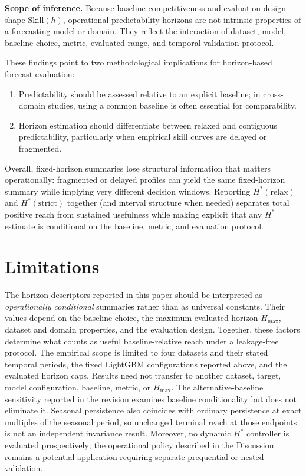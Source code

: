\documentclass[pdflatex]{sn-jnl}
\begin{document}
\textbf{Scope of inference.} Because baseline competitiveness and evaluation design shape $\mathrm{Skill}(h)$, operational predictability horizons are not intrinsic properties of a forecasting model or domain. They reflect the interaction of dataset, model, baseline choice, metric, evaluated range, and temporal validation protocol.

These findings point to two methodological implications for horizon-based forecast evaluation:
\begin{enumerate}
  \item Predictability should be assessed relative to an explicit baseline; in cross-domain studies, using a common baseline is often essential for comparability.
  \item Horizon estimation should differentiate between relaxed and contiguous predictability, particularly when empirical skill curves are delayed or fragmented.
\end{enumerate}

Overall, fixed-horizon summaries lose structural information that matters operationally: fragmented or delayed profiles can yield the same fixed-horizon summary while implying very different decision windows. Reporting $H^*(\mathrm{relax})$ and $H^*(\mathrm{strict})$ together (and interval structure when needed) separates total positive reach from sustained usefulness while making explicit that any $H^*$ estimate is conditional on the baseline, metric, and evaluation protocol.

\section{Limitations}

The horizon descriptors reported in this paper should be interpreted as
\emph{operationally conditional} summaries rather than as universal
constants. Their values depend on the baseline choice, the maximum
evaluated horizon $H_{\max}$, dataset and domain properties, and the
evaluation design. Together, these factors determine what counts as
useful baseline-relative reach under a leakage-free protocol.
The empirical scope is limited to four datasets and their stated temporal
periods, the fixed LightGBM configurations reported above, and the evaluated
horizon caps. Results need not transfer to another dataset, target, model
configuration, baseline, metric, or $H_{\max}$. The alternative-baseline
sensitivity reported in the revision examines baseline conditionality but
does not eliminate it. Seasonal persistence also coincides with ordinary
persistence at exact multiples of the seasonal period, so unchanged terminal
reach at those endpoints is not an independent invariance result. Moreover, no dynamic $H^*$ controller is evaluated
prospectively; the operational policy described in the Discussion remains a
potential application requiring separate prequential or nested validation.
\end{document}

